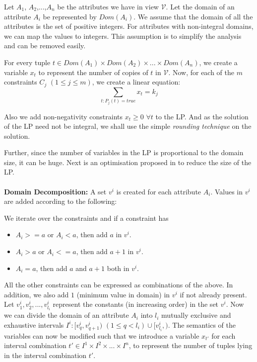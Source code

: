 \documentclass[]{article}
\begin{document}
\begin{multicols}{2}
			Let $A_{1}$, $A_{2}$,...,$A_{n}$ be the attributes we have in view $\mathcal{V}$. 
			Let the domain of an attribute $A_{i}$ be represented by $Dom(A_{i})$. 
			We assume that the domain of all the attributes is the set of positive integers. 
			For attributes with non-integral domains, we can map the values to integers. 
			This assumption is to simplify the analysis and can be removed easily.
			
			For every tuple $t \in Dom(A_{1}) \times Dom(A_{2})\times...\times Dom(A_{n})$, we create a variable $x_{t}$ to represent the number of copies of $t$ in $\mathcal{V}$. 
			Now, for each of the $m$ constraints $C_{j}$ $(1 \leq j \leq m)$, we create a linear equation:
			\begin{equation*}
				\sum_{t:P_{j}(t)=true} x_{t} = k_{j}
			\end{equation*}
			
			Also we add non-negativity constraints $x_{t} \geq 0$ $\forall t$ to the LP. 
			And as the solution of the LP need not be integral, we shall use the simple {\em rounding technique} on the solution. 
			
			Further, since the number of variables in the LP is proportional to the domain size, it can be huge. 
			Next is an optimisation proposed in \cite{arasu} to reduce the size of the LP. 
			\\ \\
			\textbf{Domain Decomposition: }
			A set $v^{i}$ is created for each attribute $A_{i}$. 
			Values in  $v^{i}$ are added according to the following: 
			
			We iterate over the constraints and if a constraint has
			\begin{itemize}
				\item $A_{i} >= a$ or $A_{i} < a$, then add $a$ in  $v^{i}$.
				\item $A_{i} > a$ or  $A_{i} <= a$, then add $a + 1$ in $v^{i}$.
				\item $A_{i} = a$, then add $a$ and $a+1$ both in $v^{i}$.
			\end{itemize}
			
			All the other constraints can be expressed as combinations of the above. 
			In addition, we also add $1$ (minimum value in domain) in $v^{i}$ if not already present. 
			Let  $v_{1}^{i}, v_{2}^{i},...,v_{l_{i}}^{i}$ represent the constants (in increasing order) in the set $v^{i}$. 
			Now we can divide the domain of an attribute $A_{i}$ into $l_{i}$ mutually exclusive and exhaustive intervals $I^{i}: [v_{q}^{i},v_{q+1}^{i})$ $(1 \leq q < l_{i}) \cup [v_{l_{i}}^{i},)$. 
			The semantics of the variables can now be modified such that we introduce a variable $x_{t'}$ for each interval combination $t' \in I^{1} \times I^{2} \times ... \times I^{n}$, to represent the number of tuples lying in the interval combination $t'$.
			

\end{multicols}
\end{document}
